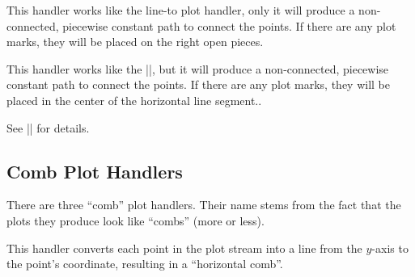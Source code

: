 \begin{command}{\pgfplothandlerjumpmarkright}
    This handler works like the line-to plot handler, only it will produce a
    non-connected, piecewise constant path to connect the points. If there are
    any plot marks, they will be placed on the right open pieces.
\begin{codeexample}[]
\end{codeexample}
\end{command}

\begin{command}{\pgfplothandlerjumpmarkmid}
    This handler works like the |\pgfplothandlerconstantlinetomarkmid|, but it
    will produce a non-connected, piecewise constant path to connect the
    points. If there are any plot marks, they will be placed in the center of
    the horizontal line segment..
\begin{codeexample}[]
\end{codeexample}
    See |\pgfplothandlerconstantlinetomarkmid| for details.
\end{command}


\subsection{Comb Plot Handlers}

There are three ``comb'' plot handlers. Their name stems from the fact that the
plots they produce look like ``combs'' (more or less).

\begin{command}{\pgfplothandlerxcomb}
    This handler converts each point in the plot stream into a line from the
    $y$-axis to the point's coordinate, resulting in a ``horizontal comb''.
\begin{codeexample}[]
\end{codeexample}
\end{command}

